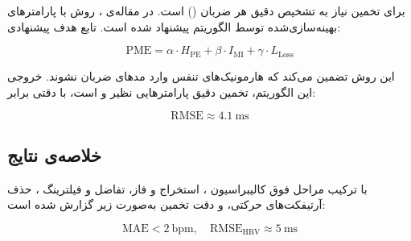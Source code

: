 برای تخمین  نیاز به تشخیص دقیق هر ضربان () است. در مقاله‌ی ، روش  با پارامترهای بهینه‌سازی‌شده توسط الگوریتم  پیشنهاد شده است. تابع هدف پیشنهادی:

\begin{equation}
\mathrm{PME} = \alpha \cdot H_{\mathrm{PE}} + \beta \cdot I_{\mathrm{MI}} + \gamma \cdot L_{\mathrm{Loss}}
\label{eq:pme_objective}
\end{equation}


این روش تضمین می‌کند که هارمونیک‌های تنفس وارد مدهای ضربان نشوند. خروجی این الگوریتم، تخمین دقیق پارامترهایی نظیر  و  است، با دقتی برابر:

\begin{equation}
\mathrm{RMSE} \approx 4.1\ \mathrm{ms}
\label{eq:rmse_sdnn}
\end{equation}

\subsection*{خلاصه‌ی نتایج}
\label{sec:summary}

با ترکیب مراحل فوق کالیبراسیون ، استخراج و  فاز، تفاضل و فیلترینگ ، حذف آرتیفکت‌های حرکتی،  و  دقت تخمین  به‌صورت زیر گزارش شده است:

\begin{equation}
\mathrm{MAE} < 2\ \mathrm{bpm},\quad \mathrm{RMSE_{HRV}} \approx 5\ \mathrm{ms}
\label{eq:hr_final_results}
\end{equation}
